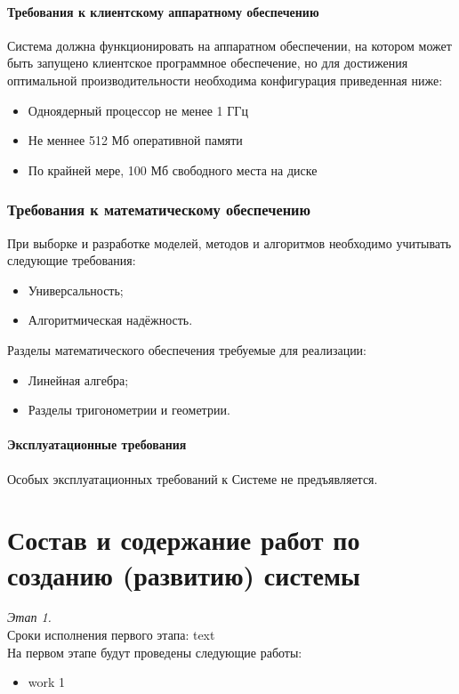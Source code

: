 \subsubsection{Требования к клиентскому аппаратному обеспечению}
Система должна функционировать на аппаратном обеспечении, на котором может быть запущено 
клиентское программное обеспечение, но для достижения оптимальной производительности 
необходима конфигурация приведенная ниже:
\begin{itemize}
    \item Одноядерный процессор не менее 1 ГГц
    \item Не меннее 512 Мб оперативной памяти
    \item По крайней мере, 100 Мб свободного места на диске
\end{itemize}

\subsection{Требования к математическому обеспечению}
При выборке и разработке моделей, методов и алгоритмов необходимо учитывать следующие требования:
\begin{itemize}
    \item Универсальность;
    \item Алгоритмическая надёжность.
\end{itemize}

Разделы математического обеспечения требуемые для реализации:
\begin{itemize}
    \item Линейная алгебра;
    \item Разделы тригонометрии и геометрии.
\end{itemize}

\subsubsection{Эксплуатационные требования}
Особых эксплуатационных требований к Системе не предъявляется.

\chapter{Состав и содержание работ по созданию (развитию) системы}
\emph{Этап 1.}\\
Сроки исполнения первого этапа: text\\
На первом этапе будут проведены следующие работы:
\begin{itemize}
    \item work 1
\end{itemize}

